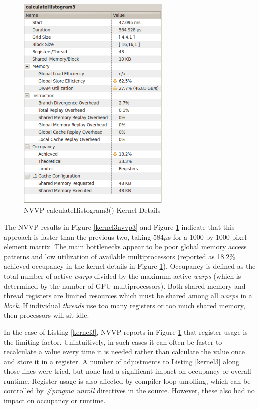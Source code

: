 \documentclass{article}
\begin{document}
\begin{figure}
\centering
\includegraphics[width=0.65\textwidth]{screenshots/nvvp/calculateHistogram3_screen4.png}
\caption{NVVP calculateHistogram3() Kernel Details}
\label{kernel3nvvp4}
\end{figure}

The NVVP results in Figure \ref{kernel3nvvp3} and Figure \ref{kernel3nvvp4} indicate that this approach is faster than the previous two, taking 584$\mu$s for a 1000 by 1000 pixel element matrix. The main bottlenecks appear to be poor global memory access patterns and low utilization of available multiprocessors (reported as 18.2\% achieved occupancy in the kernel details in Figure \ref{kernel3nvvp4}). Occupancy is defined as the total number of active \emph{warps} divided by the maximum active \emph{warps} (which is determined by the number of GPU multiprocessors). Both shared memory and thread registers are limited resources which must be shared among all \emph{warps} in a \emph{block}. If individual \emph{threads} use too many registers or too much shared memory, then processors will sit idle\cite{occupancy}.

In the case of Listing \ref{kernel3}, NVVP reports in Figure \ref{kernel3nvvp4} that register usage is the limiting factor. Unintuitively, in such cases it can often be faster to recalculate a value every time it is needed rather than calculate the value once and store it in a register. A number of adjustments to Listing \ref{kernel3} along those lines were tried, but none had a significant impact on occupancy or overall runtime. Register usage is also affected by compiler loop unrolling, which can be controlled by \emph{\#pragma unroll} directives in the source. However, these also had no impact on occupancy or runtime.
\end{document}
